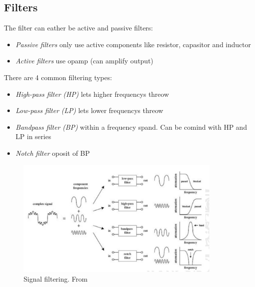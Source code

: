 



\subsection{Filters}
The filter can eather be active and passive filters:
\begin{itemize}
    \item \textit{Passive filters} only use active components like resistor, capasitor and inductor
    \item \textit{Active filters} use opamp (can amplify output)
\end{itemize}

There are 4 common filtering types:
\begin{itemize}
    \item \textit{High-pass filter (HP)} lets higher frequencys threow
    \item \textit{Low-pass filter (LP)} lets lower frequencys threow
    \item \textit{Bandpass filter (BP)} within a frequency spand. Can be comind with HP and LP in series
    \item \textit{Notch filter} oposit of BP
\end{itemize}
\begin{figure}[h]
    \vspace{10mm}
    \centering
    \includegraphics[width=10cm]{image/signal-filtering.png}
    \caption{Signal filtering. From \cite{}}
\end{figure}


